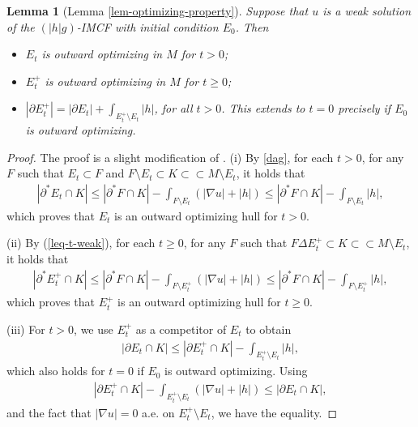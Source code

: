 \documentclass[11pt, letterpaper]{amsart}
\newtheorem{lem}[thm]{Lemma}
\theoremstyle{definition}
\theoremstyle{remark}
\begin{document}
\begin{appendix}
\begin{lem}[Lemma \ref{lem-optimizing-property}]
	Suppose that $u$ is a weak solution of the $(|h|g)$-IMCF with initial condition $E_0$. Then
	\begin{itemize}
		\item [(i)] $E_t$ is outward optimizing in $M$ for $t>0$;
		\item [(ii)] $E_t ^{+}$ is outward optimizing in $M$ for $t \geq 0$;
		\item [(iii)] $|\partial E_t ^{+}| = |\partial E_t| + \int_{E_t ^{+}\setminus E_t}|h|$, for all $t>0$. This extends to $t=0$ precisely if $E_0$ is outward optimizing.
	\end{itemize}
\end{lem}
\begin{proof}
	The proof is a slight modification of \cite[Theorem 1.4]{HI01}. (i) By \ref{dag}, for each $t>0$, for any $F$ such that $E_t \subset F$ and $F \setminus E_t \subset K \subset \subset M \setminus E_t$, it holds that
	\begin{align*}
		|\partial ^* E_t \cap K| \leq |\partial ^* F \cap K| - \int_{F \setminus E_t} \left( |\nabla u| + |h| \right) \leq |\partial ^* F \cap K| - \int_{F \setminus E_t} |h|,
	\end{align*} 
	which proves that $E_t$ is an outward optimizing hull for $t>0$.

	(ii) By (\ref{leq-t-weak}), for each $t \geq 0$, for any $F$ such that  $F \Delta  E_t^+ \subset K \subset \subset M\setminus E_t$, it holds that
\begin{align*}
		|\partial ^* E_t^+ \cap K| \leq |\partial ^* F \cap K| - \int_{F \setminus E_t^+} \left( |\nabla u| + |h| \right) \leq |\partial ^* F \cap K| - \int_{F \setminus E_t^+} |h|,
	\end{align*} 
	which proves that $E_t^+$ is an outward optimizing hull for $t \geq 0$. 

	(iii) For $t>0$, we use $E_t^+$ as a competitor of $E_t$ to obtain
	\begin{align*}
		|\partial E_t \cap K| \leq |\partial E_t^+ \cap K| - \int_{E_t^+ \setminus E_t} |h|,
	\end{align*} 
	which also holds for $t=0$ if $E_0$ is outward optimizing. Using
	\begin{align*}
		|\partial E_t^+ \cap K| - \int_{E_t^+ \setminus E_t} \left( |\nabla u| + |h|\right)  \leq |\partial E_t \cap K|,
	\end{align*} 
	and the fact that $|\nabla u| = 0$ a.e. on $E_t^+ \setminus E_t$, we have the equality.
\end{proof}



\end{appendix}
\end{document}
